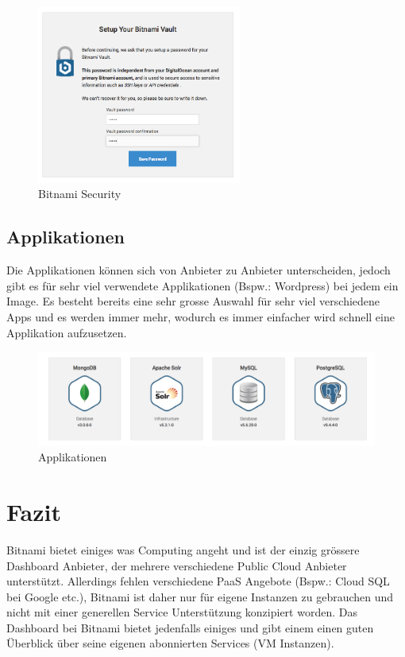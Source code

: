 \begin{figure}[!htbp]
  \centering
\includegraphics[width=0.6\textwidth]{./03_Analyse/03_Bitnami/images/bitnami_security}
\caption{Bitnami Security}
\end{figure}
\newpage

\subsection{Applikationen}
Die Applikationen können sich von Anbieter zu Anbieter unterscheiden, jedoch 
gibt es für sehr viel verwendete Applikationen (Bspw.: Wordpress) bei jedem ein 
Image.
Es besteht bereits eine sehr grosse Auswahl für sehr viel verschiedene Apps und 
es werden immer mehr, wodurch es immer einfacher wird schnell eine Applikation 
aufzusetzen.

\begin{figure}[!htbp]
\includegraphics[width=\textwidth]{./03_Analyse/03_Bitnami/images/apps}
\caption{Applikationen}
\end{figure}

\newpage 
\section{Fazit}
Bitnami bietet einiges was Computing angeht und ist der einzig grössere 
Dashboard Anbieter, der mehrere verschiedene Public Cloud Anbieter unterstützt.
Allerdings fehlen verschiedene PaaS Angebote (Bspw.: Cloud SQL bei Google etc.), 
Bitnami ist daher nur für eigene Instanzen zu gebrauchen und nicht mit einer 
generellen Service Unterstützung konzipiert worden.
Das Dashboard bei Bitnami bietet jedenfalls einiges und gibt einem einen guten 
Überblick über seine eigenen abonnierten Services (VM Instanzen).
